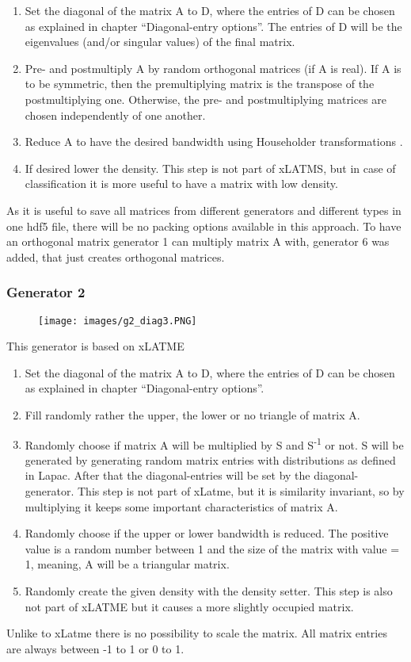 \documentclass[parskip=full]{scrartcl}
\begin{document}
\begin{enumerate}
	\item Set the diagonal of the matrix A to D, where the entries of D can be chosen as explained in chapter “Diagonal-entry options”. The entries of D will be the eigenvalues (and/or singular values) of the final matrix.
	\item Pre- and postmultiply A by random orthogonal matrices (if A is real). If A is to be symmetric, then the premultiplying matrix is the transpose of the postmultiplying one. Otherwise, the pre- and postmultiplying matrices are chosen independently of one another.
	\item Reduce A to have the desired bandwidth using Householder transformations \cite{numerikskript}.
	\item If desired lower the density. This step is not part of xLATMS, but in case of classification it is more useful to have a matrix with low density. 
\end{enumerate}

As it is useful to save all matrices from different generators and different types in one hdf5 file, there will be no packing options available in this approach.
To have an orthogonal matrix generator 1 can multiply matrix A with, generator 6 was added, that just creates orthogonal matrices.

\newpage
\subsubsection{Generator 2}
\begin{figure}[h!]
	\texttt{[image: images/g2\_diag3.PNG]}
\end{figure}
This generator is based on xLATME
\begin{enumerate}
	\item Set the diagonal of the matrix A to D, where the entries of D can be chosen as explained in chapter “Diagonal-entry options”.
	\item Fill randomly rather the upper, the lower or no triangle of matrix A.
	\item Randomly choose if matrix A will be multiplied by S and S\textsuperscript{-1} or not. S will be generated by generating random matrix entries with distributions as defined in Lapac. After that the diagonal-entries will be set by the diagonal-generator.
	This step is not part of xLatme, but it is similarity invariant, so by multiplying it keeps some important characteristics of matrix A.
	\item Randomly choose if the upper or lower bandwidth is reduced. The positive value is a random number between 1 and the size of the matrix with value = 1, meaning, A will be a triangular matrix.
	\item Randomly create the given density with the density setter. This step is also not part of xLATME but it causes a more slightly occupied matrix.
\end{enumerate}
Unlike to xLatme there is no possibility to scale the matrix. All matrix entries are always between -1 to 1 or 0 to 1.
\end{document}

